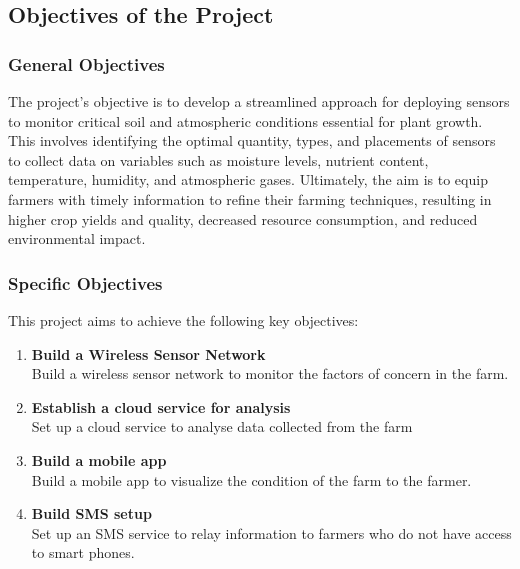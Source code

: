 \documentclass[12pt, a4paper]{article}
\begin{document}
\newpage
\subsection{Objectives of the Project}
\subsubsection{General Objectives}
The project's objective is to develop a streamlined approach for deploying sensors to monitor critical soil and atmospheric conditions essential for plant growth. This involves identifying the optimal quantity, types, and placements of sensors to collect data on variables such as moisture levels, nutrient content, temperature, humidity, and atmospheric gases. Ultimately, the aim is to equip farmers with timely information to refine their farming techniques, resulting in higher crop yields and quality, decreased resource consumption, and reduced environmental impact.
\subsubsection{Specific Objectives}
This project aims to achieve the following key objectives:\\
\begin{enumerate}
\item \textbf{Build a Wireless Sensor Network}\\
Build a wireless sensor network to monitor the factors of concern in the farm.
\item \textbf{Establish a cloud service for analysis}\\
Set up a cloud service to analyse data collected from the farm
\item \textbf{Build a mobile app}\\
Build a mobile app to visualize the condition of the farm to the farmer.
\item \textbf{Build SMS setup}\\
Set up an SMS service to relay information to farmers who do not have access to smart phones.
\end{enumerate}

\newpage
\end{document}
